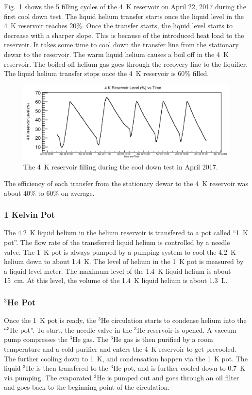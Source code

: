 Fig.~\ref{fig:4kfilling} shows the 5 filling cycles of the 4~K
reservoir on April 22, 2017 during the first cool down test. The
liquid helium transfer starts once the liquid level in the 4~K
reservoir reaches 20\%. Once the transfer starts, the liquid level
starts to decrease with a sharper slope. This is because of the
introduced heat load to the reservoir. It takes some time to cool down
the transfer line from the stationary dewar to the reservoir. The warm
liquid helium causes a boil off in the 4~K reservoir. The boiled off
helium gas goes through the recovery line to the liquifier. The liquid
helium transfer stops once the 4~K reservoir is 60\% filled.

\begin{figure}[h!]
  \centering
  \includegraphics[width=1.0\textwidth]{april_4kfilling.png}
  \caption{The 4~K reservoir filling during the cool down test in April 2017.}
  \label{fig:4kfilling}
\end{figure}
The efficiency of each transfer from the stationary dewar to the 4~K
reservoir was about 40\% to 60\% on average.

\subsubsection{1 Kelvin Pot}
The 4.2~K liquid helium in the helium reservoir is transfered to a
pot called ``1~K pot''. The flow rate of the transferred liquid
helium is controlled by a needle valve. The 1~K pot is always pumped
by a pumping system to cool the 4.2~K helium down to about 1.4~K. The
level of helium in the 1~K pot is measured by a liquid level
meter. The maximum level of the 1.4~K liquid helium is about 15~cm. At
this level, the volume of the 1.4~K liquid helium is about 1.3~L.


\subsubsection{$^3$He Pot}
Once the 1~K pot is ready, the $^3$He circulation starts to condense
helium into the ``$^3$He pot''. To start, the needle valve in the $^3$He
reservoir is opened. A vaccum pump compresses the $^3$He gas. The
$^3$He gas is then purified by a room temperature and a cold purifier
and enters the 4~K reservoir to get precooled. The further cooling down
to 1~K, and condensation happen via the 1~K pot. The liquid $^3$He is
then transfered to the $^3$He pot, and is further cooled down to 0.7~K
via pumping. The evaporated $^3$He is pumped out and goes through an
oil filter and goes back to the beginning point of the circulation.

